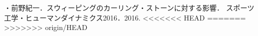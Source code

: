\documentclass[main]{subfiles}
\begin{document}
{}
・前野紀一．スウィーピングのカーリング・ストーンに対する影響．
スポーツ工学・ヒューマンダイナミクス2016．2016.
<<<<<<< HEAD
=======
>>>>>>> origin/HEAD
\printbibliography[title=参考文献]
\end{document}
